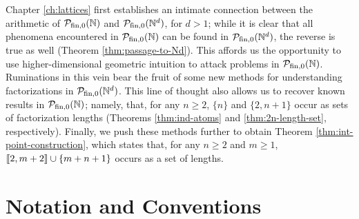 Chapter \ref{ch:lattices} first establishes an intimate connection between the arithmetic of ${\mathcal{P}_{\textrm{fin},0}(\mathbb{N})}$ and $\mathcal{P}_{\textrm{fin}, 0}(\mathbb{N}^d)$, for $d>1$; 
while it is clear that all phenomena encountered in ${\mathcal{P}_{\textrm{fin},0}(\mathbb{N})}$ can be found in $\mathcal{P}_{\textrm{fin}, 0}(\mathbb{N}^d)$, the reverse is true as well (Theorem \ref{thm:passage-to-Nd}).  
This affords us the opportunity to use higher-dimensional geometric intuition to attack problems in ${\mathcal{P}_{\textrm{fin},0}(\mathbb{N})}$.
Ruminations in this vein bear the fruit of some new methods for understanding factorizations in $\mathcal{P}_{\textrm{fin}, 0}(\mathbb{N}^d)$.
This line of thought also allows us to recover known results in ${\mathcal{P}_{\textrm{fin},0}(\mathbb{N})}$; namely, that, for any $n\ge 2$, $\{n\}$ and $\{2,n+1\}$ occur as sets of factorization lengths (Theorems \ref{thm:ind-atoms} and \ref{thm:2n-length-set}, respectively).
Finally, we push these methods further to obtain Theorem \ref{thm:int-point-construction}, which states that, for any $n\ge 2$ and $m\ge 1$, $\llbracket 2,m+2 \rrbracket \cup \{m+n+1\}$ occurs as a set of lengths.

\section{Notation and Conventions} \label{subsec:generalities}

